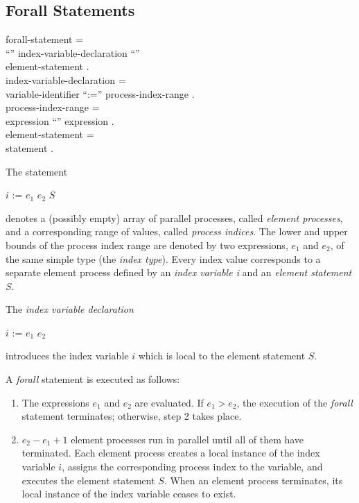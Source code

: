 \subsection{Forall Statements}

\begin{grammar}
  {\GA}forall-statement =                                  \\
    {\GB}``{\Forall}'' index-variable-declaration ``{\Do}''\\
      {\GC}element-statement .                             \\
  {\GA}index-variable-declaration =                        \\
    {\GB}variable-identifier ``:='' process-index-range .  \\
  {\GA}process-index-range =                               \\
     {\GB}expression ``{\To}'' expression .                \\
  {\GA}element-statement =                                 \\
     {\GB}statement .                                      \\
\end{grammar}

The statement

\begin{center}
  {\Forall} $i$ := $e_1$ {\To} $e_2$ {\Do} $S$
\end{center}

\noindent
denotes a (possibly empty) array of parallel processes,
called {\it element processes}, and a corresponding range of
values, called {\it process indices}. The lower and upper
bounds of the process index range are denoted by two
expressions, $e_1$ and $e_2$, of the same simple type (the
{\it index type}). Every index value corresponds to a
separate element process defined by an {\it index variable
i} and an {\it element statement S}.

The {\it index variable declaration}

\begin{center}
  $i$ := $e_1$ {\To} $e_2$
\end{center}

\noindent
introduces the index variable $i$ which is local to the
element statement $S$.

A {\it forall} statement is executed as follows:

\begin{enumerate}
  \item
  The expressions $e_1$ and $e_2$ are evaluated. If
  $e_1 > e_2$, the execution of the {\it forall} statement
  terminates; otherwise, step 2 takes place.
  \item
  $e_2-e_1+1$ element processes run in parallel until all of
  them have terminated. Each element process creates a local
  instance of the index variable $i$, assigns the
  corresponding process index to the variable, and executes
  the element statement $S$. When an element process
  terminates, its local instance of the index variable
  ceases to exist.
\end{enumerate}

